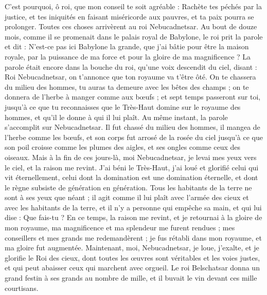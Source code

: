 \begin{multicols}{2}
C'est pourquoi, ô roi, que mon conseil te soit agréable : Rachète tes péchés par la justice, et tes iniquités en faisant miséricorde aux pauvres, et ta paix pourra se prolonger.
Toutes ces choses arrivèrent au roi Nebucadnetsar.
Au bout de douze mois, comme il se promenait dans le palais royal de Babylone,
le roi prit la parole et dit : N'est-ce pas ici Babylone la grande, que j'ai bâtie pour être la maison royale, par la puissance de ma force et pour la gloire de ma magnificence ?
La parole était encore dans la bouche du roi, qu'une voix descendit du ciel, disant : Roi Nebucadnetsar, on t'annonce que ton royaume va t'être ôté.
On te chassera du milieu des hommes, tu auras ta demeure avec les bêtes des champs ; on te donnera de l'herbe à manger comme aux bœufs ; et sept temps passeront sur toi, jusqu'à ce que tu reconnaisses que le Très-Haut domine sur le royaume des hommes, et qu'il le donne à qui il lui plaît.
Au même instant, la parole s'accomplit sur Nebucadnetsar. Il fut chassé du milieu des hommes, il mangea de l'herbe comme les bœufs, et son corps fut arrosé de la rosée du ciel jusqu'à ce que son poil croisse comme les plumes des aigles, et ses ongles comme ceux des oiseaux.
Mais à la fin de ces jours-là, moi Nebucadnetsar, je levai mes yeux vers le ciel, et la raison me revint. J'ai béni le Très-Haut, j'ai loué et glorifié celui qui vit éternellement, celui dont la domination est une domination éternelle, et dont le règne subsiste de génération en génération.
Tous les habitants de la terre ne sont à ses yeux que néant ; il agit comme il lui plaît avec l'armée des cieux et avec les habitants de la terre, et il n'y a personne qui empêche sa main, et qui lui dise : Que fais-tu ?
En ce temps, la raison me revint, et je retournai à la gloire de mon royaume, ma magnificence et ma splendeur me furent rendues ; mes conseillers et mes grands me redemandèrent ; je fus rétabli dans mon royaume, et ma gloire fut augmentée.
Maintenant, moi, Nebucadnetsar, je loue, j'exalte, et je glorifie le Roi des cieux, dont toutes les œuvres sont véritables et les voies justes, et qui peut abaisser ceux qui marchent avec orgueil.
\VerseOne{}Le roi Belschatsar donna un grand festin à ses grands au nombre de mille, et il buvait le vin devant ces mille courtisans.

\end{multicols}

